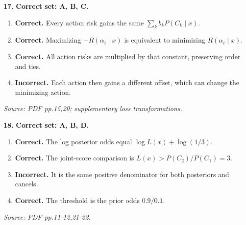 \documentclass[11pt,a4paper]{article}
\begin{document}
\par\noindent\begin{minipage}{\linewidth}
\textbf{17.} \textbf{Correct set: A, B, C.}
\begin{enumerate}[label=(\Alph*),leftmargin=8mm,itemsep=2pt,topsep=2pt]
\item \textbf{Correct.} Every action risk gains the same \(\sum_kb_kP(C_k\mid x)\).
\item \textbf{Correct.} Maximizing \(-R(\alpha_i\mid x)\) is equivalent to minimizing \(R(\alpha_i\mid x)\).
\item \textbf{Correct.} All action risks are multiplied by that constant, preserving order and ties.
\item \textbf{Incorrect.} Each action then gains a different offset, which can change the minimizing action.
\end{enumerate}
{\footnotesize\textit{Source: PDF pp.15,20; supplementary loss transformations.}}

\end{minipage}\par\vspace{3mm}
\par\noindent\begin{minipage}{\linewidth}
\textbf{18.} \textbf{Correct set: A, B, D.}
\begin{enumerate}[label=(\Alph*),leftmargin=8mm,itemsep=2pt,topsep=2pt]
\item \textbf{Correct.} The log posterior odds equal \(\log L(x)+\log(1/3)\).
\item \textbf{Correct.} The joint-score comparison is \(L(x)>P(C_2)/P(C_1)=3\).
\item \textbf{Incorrect.} It is the same positive denominator for both posteriors and cancels.
\item \textbf{Correct.} The threshold is the prior odds \(0.9/0.1\).
\end{enumerate}
{\footnotesize\textit{Source: PDF pp.11-12,21-22.}}

\end{minipage}\par\vspace{3mm}
\end{document}
